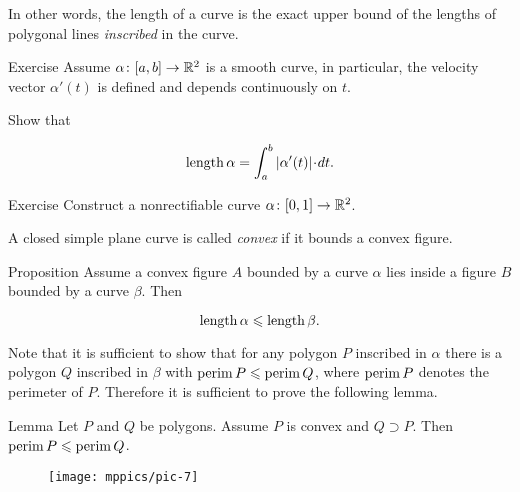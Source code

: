 In other words, the length of a curve is the exact upper bound of the lengths of polygonal lines \emph{inscribed} in the curve.



\begin{thm}{Exercise}
Assume $\alpha\colon[a,b]\to\mathbb{R}^2$ is a smooth curve, in particular, the velocity vector $\alpha'(t)$ is defined and depends continuously on $t$.

Show that

\[\length \alpha=\int_a^b|\alpha'(t)|\cdot dt.\]

\end{thm}



\begin{thm}{Exercise}\label{ex:nonrectifiable-curve}
Construct a nonrectifiable curve $\alpha\colon[0,1]\to\mathbb{R}^2$.

\end{thm}



A closed simple plane curve is called \emph{convex} if it bounds a convex figure.



\begin{thm}{Proposition}\label{prop:convex-curve}
Assume a convex figure $A$ bounded by a curve $\alpha$ lies inside a figure $B$ bounded by a curve $\beta$.
Then

\[\mathop{\rm length}\nolimits\alpha\leqslant \mathop{\rm length}\nolimits\beta.\]

\end{thm}



Note that it is sufficient to show that for any polygon  $P$ inscribed in $\alpha$ there is a polygon $Q$ inscribed in $\beta$ with  
$\mathop{\rm perim}\nolimits P\leqslant \mathop{\rm perim}\nolimits Q$, where $\mathop{\rm perim}\nolimits P$ denotes the perimeter of $P$.
Therefore it is sufficient to prove the following lemma.



\begin{thm}{Lemma}\label{lem:perimeter}
Let $P$ and $Q$ be polygons.
Assume $P$ is convex and $Q\supset P$.
Then $\mathop{\rm perim}\nolimits P\leqslant \mathop{\rm perim}\nolimits Q$.
\end{thm}



\begin{wrapfigure}{r}{24 mm}
\vskip-4mm
\centering

\texttt{[image: mppics/pic-7]}


\end{wrapfigure}



